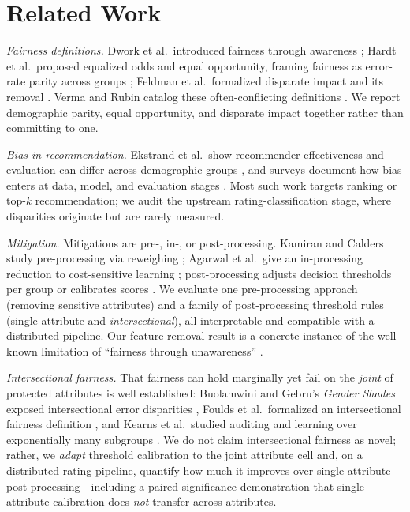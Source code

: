 \documentclass[conference]{IEEEtran}
\begin{document}
\section{Related Work}\label{sec:related}
\textit{Fairness definitions.} Dwork et al.\ introduced fairness through awareness
\cite{dwork2012fairness}; Hardt et al.\ proposed equalized odds and equal
opportunity, framing fairness as error-rate parity across groups
\cite{hardt2016equality}; Feldman et al.\ formalized disparate impact and its
removal \cite{feldman2015certifying}. Verma and Rubin catalog these often-conflicting
definitions \cite{verma2018fairness}. We report demographic parity, equal
opportunity, and disparate impact together rather than committing to one.

\textit{Bias in recommendation.} Ekstrand et al.\ show recommender effectiveness and
evaluation can differ across demographic groups \cite{ekstrand2018all}, and surveys
document how bias enters at data, model, and evaluation stages
\cite{mehrabi2021survey}. Most such work targets ranking or top-$k$ recommendation;
we audit the upstream rating-classification stage, where disparities originate but
are rarely measured.

\textit{Mitigation.} Mitigations are pre-, in-, or post-processing. Kamiran and
Calders study pre-processing via reweighing \cite{kamiran2012data}; Agarwal et al.\
give an in-processing reduction to cost-sensitive learning \cite{agarwal2018reductions};
post-processing adjusts decision thresholds per group \cite{hardt2016equality} or
calibrates scores \cite{pleiss2017calibration,corbett2017cost}. We evaluate one
pre-processing approach (removing sensitive attributes) and a family of post-processing
threshold rules (single-attribute and \emph{intersectional}), all interpretable and
compatible with a distributed pipeline. Our feature-removal result is a concrete instance
of the well-known limitation of ``fairness through unawareness'' \cite{dwork2012fairness}.

\textit{Intersectional fairness.} That fairness can hold marginally yet fail on the
\emph{joint} of protected attributes is well established: Buolamwini and Gebru's
\emph{Gender Shades} exposed intersectional error disparities \cite{buolamwini2018gender},
Foulds et al.\ formalized an intersectional fairness definition
\cite{foulds2020intersectional}, and Kearns et al.\ studied auditing and learning over
exponentially many subgroups \cite{kearns2018gerrymandering}. We do not claim
intersectional fairness as novel; rather, we \emph{adapt} threshold calibration to the
joint attribute cell and, on a distributed rating pipeline, quantify how much it improves
over single-attribute post-processing---including a paired-significance demonstration that
single-attribute calibration does \emph{not} transfer across attributes.
\end{document}
